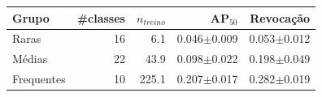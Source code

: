 \begin{tabular}{lrrrr}
\toprule
Grupo & \#classes & $n_{treino}$ & AP$_{50}$ & Revocação \\
\midrule
Raras & 16 & 6.1 & 0.046$\pm$0.009 & 0.053$\pm$0.012 \\
Médias & 22 & 43.9 & 0.098$\pm$0.022 & 0.198$\pm$0.049 \\
Frequentes & 10 & 225.1 & 0.207$\pm$0.017 & 0.282$\pm$0.019 \\
\bottomrule
\end{tabular}

